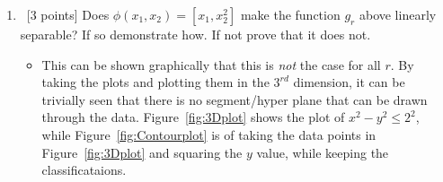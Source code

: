 \begin{enumerate}
\item ~[3 points] Does $\phi(x_1,x_2) = [x_1,x_2^2]$ make the function
  $g_r$ above linearly separable? If so demonstrate how. If not prove
  that it does not.

\begin{itemize}
\item This can be shown graphically that this is {\em not} the case for all $r$. By taking the plots and plotting them in the $3^{rd}$ dimension, it can be trivially seen that there is no segment/hyper plane that can be drawn through the data. Figure~\ref{fig:3Dplot} shows the plot of $x^{2}-y^{2}\leq 2^{2}$, while Figure~\ref{fig:Contourplot} is of taking the data points in Figure~\ref{fig:3Dplot} and squaring the $y$ value, while keeping the classificataions.



\end{itemize}
\end{enumerate}
